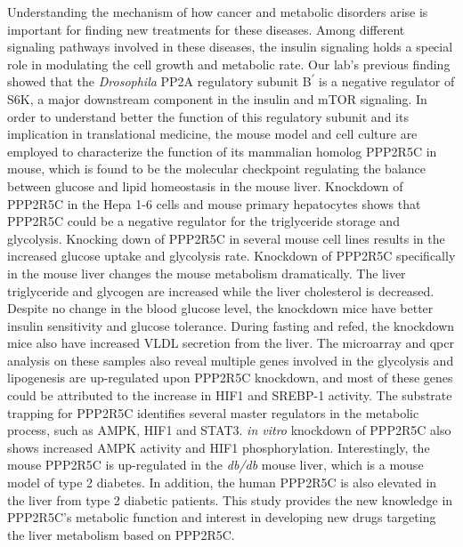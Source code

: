 
Understanding the mechanism of how cancer and metabolic disorders arise is important for finding new treatments for these diseases. Among different signaling pathways involved in these diseases, the insulin signaling holds a special role in modulating the cell growth and metabolic rate. Our lab's previous finding \cite{hahn_pp2a_2010} showed that the \textit{Drosophila} PP2A regulatory subunit B\textsuperscript{$\prime$} is a negative regulator of S6K, a major downstream component in the insulin and mTOR signaling. In order to understand better the function of this regulatory subunit and its implication in translational medicine, the mouse model and cell culture are employed to characterize the function of its mammalian homolog PPP2R5C in mouse, which is found to be the molecular checkpoint regulating the balance between glucose and lipid homeostasis in the mouse liver. Knockdown of PPP2R5C in the Hepa 1-6 cells and mouse primary hepatocytes shows that PPP2R5C could be a negative regulator for the triglyceride storage and glycolysis. Knocking down of PPP2R5C in several mouse cell lines results in the increased glucose uptake and glycolysis rate. Knockdown of PPP2R5C specifically in the mouse liver changes the mouse metabolism dramatically. The liver triglyceride and glycogen are increased while the liver cholesterol is decreased. Despite no change in the blood glucose level, the knockdown mice have better insulin sensitivity and glucose tolerance. During fasting and refed, the knockdown mice also have increased VLDL secretion from the liver. The microarray and \gls{qpcr} analysis on these samples also reveal multiple genes involved in the glycolysis and lipogenesis are up-regulated upon PPP2R5C knockdown, and most of these genes could be attributed to the increase in HIF1\textalpha{} and SREBP-1 activity. The substrate trapping for PPP2R5C identifies several master regulators in the metabolic process, such as AMPK, HIF1\textalpha{} and STAT3. \textit{in vitro} knockdown of PPP2R5C also shows increased AMPK activity and HIF1\textalpha{} phosphorylation. Interestingly, the mouse PPP2R5C is up-regulated in the \textit{db/db} mouse liver, which is a mouse model of type 2 diabetes. In addition, the human PPP2R5C is also elevated in the liver from type 2 diabetic patients. This study provides the new knowledge in PPP2R5C's metabolic function and interest in developing new drugs targeting the liver metabolism based on PPP2R5C.